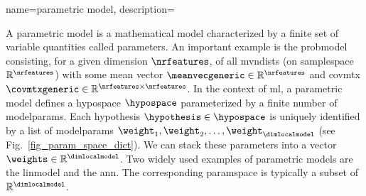 {name={parametric model},
	description={
		A parametric \gls{model} is a mathematical \gls{model} characterized 
		by a finite set of variable quantities called \glspl{parameter}.
		An important example is the \gls{probmodel} consisting, for a given 
		\gls{dimension} $\nrfeatures$, of all \glspl{mvndist} (on \gls{samplespace} 
		$\mathbb{R}^{\nrfeatures}$) with some \gls{mean} \gls{vector} 
		$\meanvecgeneric \in \mathbb{R}^{\nrfeatures}$ and \gls{covmtx} $\covmtxgeneric \in \mathbb{R}^{\nrfeatures \times \nrfeatures}$.
        In the context of \gls{ml}, a parametric \gls{model} defines a 
		\gls{hypospace} $\hypospace$ parameterized by a finite number of \glspl{modelparam}.
        Each \gls{hypothesis} $\hypothesis \in \hypospace$ is uniquely identified by a 
		list of \glspl{modelparam} $\weight_{1}, \weight_{2}, \ldots, \weight_{\dimlocalmodel}$ 
		(see Fig.~\ref{fig_param_space_dict}). We can stack these \glspl{parameter} into a 
		\gls{vector} $\weights \in \mathbb{R}^{\dimlocalmodel}$. Two widely used examples 
		of parametric \glspl{model} are the \gls{linmodel} and the \gls{ann}. The 
		corresponding \gls{paramspace} is typically a subset of $\mathbb{R}^{\dimlocalmodel}$.
		\begin{figure}[H]
			\begin{center}
\end{center}
\end{figure}}}
